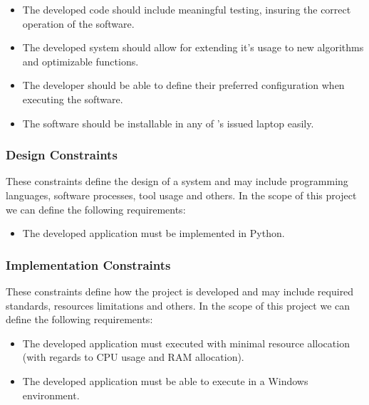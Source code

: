\begin{itemize}
	\item The developed code should include meaningful testing, insuring the correct operation of the software.
	\item The developed system should allow for extending it's usage to new algorithms and optimizable functions.
	\item The developer should be able to define their preferred configuration when executing the software.
	\item The software should be installable in any of \faro's issued laptop easily.
\end{itemize}

\subsubsection{Design Constraints}


These constraints define the design of a system and may include programming languages, software processes, tool usage and others. In the scope of this project we can define the following requirements:

\begin{itemize}
	\item The developed application must be implemented in Python.
\end{itemize}

\subsubsection{Implementation Constraints} 

These constraints define how the project is developed and may include required standards, resources limitations and others. In the scope of this project we can define the following requirements:

\begin{itemize}
	\item The developed application must executed with minimal resource allocation (with regards to CPU usage and RAM allocation).
	\item The developed application must be able to execute in a Windows environment.
\end{itemize}



